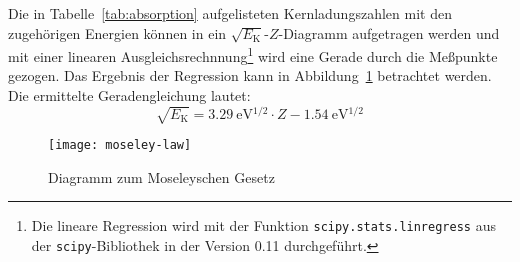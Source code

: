 Die in Tabelle~\ref{tab:absorption} aufgelisteten Kernladungszahlen mit
den zugehörigen Energien können in ein
$\sqrt{E_\mathrm{K}}$-$Z$-Diagramm aufgetragen werden und mit einer
linearen Ausgleichsrechnnung\footnote{Die lineare Regression wird mit
  der Funktion \texttt{scipy.stats.linregress} aus der
  \texttt{scipy}-Bibliothek in der Version 0.11 durchgeführt.} wird eine
Gerade durch die Meßpunkte gezogen. Das Ergebnis der Regression kann in
Abbildung~\ref{fig:moseley} betrachtet werden. Die ermittelte
Geradengleichung lautet:
%
\begin{equation}
  \label{eq:moseley-gerade}
  \sqrt{E_\mathrm{K}} = \SI{3.29}{\electronvolt^{1/2}} \cdot Z
  - \SI{1.54}{\electronvolt^{1/2}}
\end{equation}

\begin{figure}
  \centering
  \texttt{[image: moseley-law]}
  \caption{Diagramm zum Moseleyschen Gesetz}
  \label{fig:moseley}
\end{figure}
